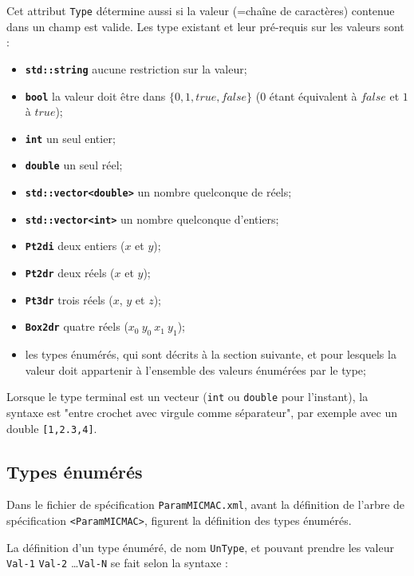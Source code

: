 Cet attribut {\tt Type}   d\'etermine aussi si la valeur (=cha\^ine de 
caract\`eres) contenue dans un champ est valide. Les type existant et
leur pr\'e-requis sur les valeurs sont :


\begin{itemize}
   \item {\bf \tt std::string} aucune restriction sur la valeur;
   \item {\bf \tt bool} la valeur doit \^etre dans $\{0,1,true,false\}$
         ($0$ \'etant \'equivalent \`a $false$ et $1$ \`a $true$);
   \item {\bf \tt int} un seul entier;
   \item {\bf \tt double} un seul r\'eel;
   \item {\bf \tt std::vector<double>} un nombre quelconque de r\'eels;
   \item {\bf \tt std::vector<int>} un nombre quelconque d'entiers;
   \item {\bf \tt Pt2di} deux entiers ($x$ et $y$);
   \item {\bf \tt Pt2dr}  deux r\'eels ($x$ et $y$);
   \item {\bf \tt Pt3dr}  trois r\'eels ($x$, $y$ et $z$);
   \item {\bf \tt Box2dr} quatre r\'eels ($x_0 \ y_0\ x_1\ y_1$);
   \item les types \'enum\'er\'es, qui sont d\'ecrits \`a la section
         suivante, et pour lesquels la valeur doit appartenir \`a 
         l'ensemble des valeurs \'enum\'er\'ees par le type;
\end{itemize}

Lorsque le type terminal est un vecteur ({\tt int} ou {\tt double} pour
l'instant), la syntaxe est "entre crochet avec virgule comme s\'eparateur",
par exemple  avec un double {\tt [1,2.3,4]}.

\subsection{Types \'enum\'er\'es}

\label{Type::Enum}

Dans le fichier de sp\'ecification {\tt ParamMICMAC.xml},
avant la d\'efinition de l'arbre de sp\'ecification {\tt <ParamMICMAC>},
figurent la d\'efinition des types  \'enum\'er\'es.

La d\'efinition d'un type \'enum\'er\'e, de nom {\tt UnType}, et
pouvant prendre les valeur  {\tt Val-1} {\tt Val-2} \dots {\tt Val-N}
se fait selon la syntaxe :

